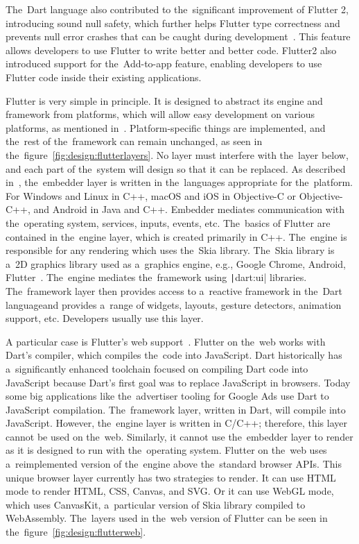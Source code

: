 The~Dart language also contributed to the~significant improvement of Flutter 2, introducing sound null safety, which further helps Flutter type correctness and prevents null error crashes that can be caught during development~\cite{sells_2021_whats}.
This feature allows developers to use Flutter to write better and better code.
Flutter2 also introduced support for the~Add-to-app feature, enabling developers to use Flutter code inside their existing applications.

Flutter is very simple in principle.
It is designed to abstract its engine and framework from platforms, which will allow easy development on various platforms, as mentioned in~\cite{a2022_flutter_architecture}.
Platform-specific things are implemented, and the~rest of the~framework can remain unchanged, as seen in the~figure~\ref{fig:design:flutterlayers}.
No layer must interfere with the~layer below, and each part of the~system will design so that it can be replaced.
As described in~\cite{a2022_flutter_architecture}, the~embedder layer is written in the~languages appropriate for the~platform.
For Windows and Linux in C++, macOS and iOS in Objective-C or Objective-C++, and Android in Java and C++.
Embedder mediates communication with the~operating system, services, inputs, events, etc.
The~basics of Flutter are contained in the~engine layer, which is created primarily in C++.
The~engine is responsible for any rendering which uses the~Skia library.
The~Skia library is a~2D graphics library used as a~graphics engine, e.g., Google Chrome, Android, Flutter~\cite{skia_2022_skia}.
The~engine mediates the~framework using \texttt|dart:ui| libraries.
The~framework layer then provides access to a~reactive framework in the~Dart language\linebreak{}and provides a~range of widgets, layouts, gesture detectors, animation support, etc.
Developers usually use this layer.

A particular case is Flutter's web support~\cite{a2022_flutter_architecture}.
Flutter on the~web works with Dart's compiler, which compiles the~code into JavaScript.
Dart historically has a~significantly enhanced toolchain focused on compiling Dart code into JavaScript because Dart's first goal was to replace JavaScript in browsers.
Today some big applications like the~advertiser tooling for Google Ads use Dart to JavaScript compilation.
The~framework layer, written in Dart, will compile into JavaScript.
However, the~engine layer is written in C/C++; therefore, this layer cannot be used on the~web.
Similarly, it cannot use the~embedder layer to render as it is designed to run with the~operating system.
Flutter on the~web uses a~reimplemented version of the~engine above the~standard browser APIs.
This unique browser layer currently has two strategies to render.
\linebreak
It can use HTML mode to render HTML, CSS, Canvas, and SVG.
Or it can use WebGL mode, which uses CanvasKit, a~particular version of Skia library compiled to WebAssembly.
The~layers used in the~web version of Flutter can be seen in the~figure~\ref{fig:design:flutterweb}.

